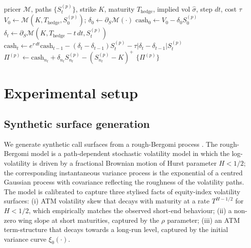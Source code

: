 \documentclass[largeformat]{interact}
\let\cite\citep   %
\theoremstyle{plain}
\theoremstyle{definition}
\begin{document}
\begin{algorithm}[t]
\caption{Delta-hedge PnL simulation}
\label{alg:hedge}
\begin{algorithmic}[1]
\Require pricer $\mathcal{M}$, paths $\{S^{(p)}_t\}$, strike $K$, maturity $T_{\mathrm{hedge}}$, implied vol $\widehat\sigma$, step $dt$, cost $\tau$
  \State $V_0 \gets \mathcal{M}(K, T_{\mathrm{hedge}}, S^{(p)}_0)$; $\delta_0 \gets \partial_S \mathcal{M}(\cdot)$
  \State $\mathrm{cash}_0 \gets V_0 - \delta_0 S^{(p)}_0$
    \State $\delta_t \gets \partial_S\mathcal{M}(K, T_{\mathrm{hedge}} - t\,dt, S^{(p)}_t)$
    \State $\mathrm{cash}_t \gets e^{r\,dt}\mathrm{cash}_{t-1} - (\delta_t - \delta_{t-1}) S^{(p)}_t - \tau|\delta_t - \delta_{t-1}|S^{(p)}_t$
  \EndFor
  \State $\Pi^{(p)} \gets \mathrm{cash}_{n_t} + \delta_{n_t} S^{(p)}_{n_t} - (S^{(p)}_{n_t} - K)^+$
\EndFor
\State \Return $\{\Pi^{(p)}\}$
\end{algorithmic}
\end{algorithm}

\section{Experimental setup}
\label{sec:experimental-setup}

\subsection{Synthetic surface generation}
\label{sec:data-gen}

We generate synthetic call surfaces from a rough-Bergomi process \cite{bayer2016pricing,bayer2023primer}. The rough-Bergomi model is a path-dependent stochastic volatility model in which the log-volatility is driven by a fractional Brownian motion of Hurst parameter $H < 1/2$; the corresponding instantaneous variance process is the exponential of a centred Gaussian process with covariance reflecting the roughness of the volatility paths. The model is calibrated to capture three stylised facts of equity-index volatility surfaces: (i) ATM volatility skew that decays with maturity at a rate $T^{H - 1/2}$ for $H < 1/2$, which empirically matches the observed short-end behaviour; (ii) a non-zero wing slope at short maturities, captured by the $\rho$ parameter; (iii) an ATM term-structure that decays towards a long-run level, captured by the initial variance curve $\xi_0(\cdot)$.
\end{document}
